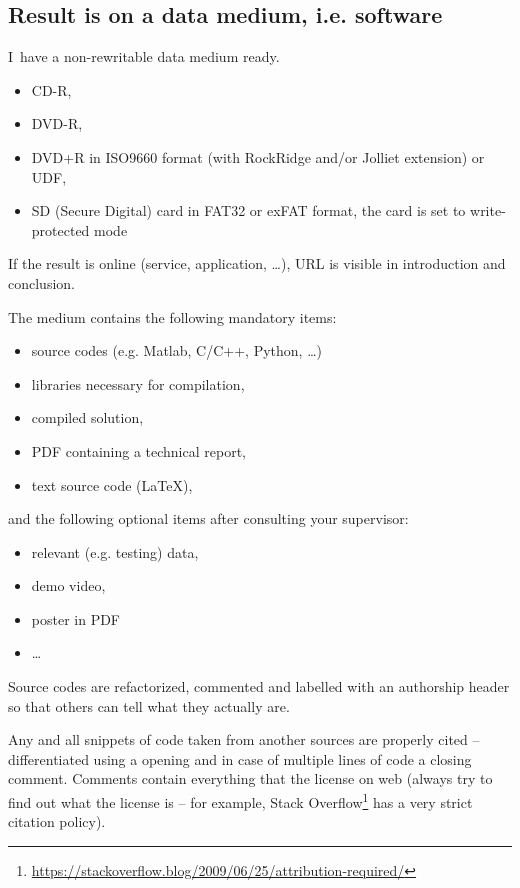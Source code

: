 \subsection*{Result is on a data medium, i.e. software}
\begin{checklist}
	\item I~have a non-rewritable data medium ready.
    \begin{itemize}
    	\item CD-R,
        \item DVD-R,
        \item DVD+R in ISO9660 format (with RockRidge and/or Jolliet extension) or UDF,
        \item SD (Secure Digital) card in FAT32 or exFAT format, the card is set to write-protected mode
    \end{itemize}
    \item If the result is online (service, application, …), URL is visible in introduction and conclusion.
    \item The medium contains the following mandatory items:
    \begin{itemize}
    	\item source codes (e.g. Matlab, C/C++, Python, \ldots)
        \item libraries necessary for compilation,
        \item compiled solution,
        \item PDF containing a technical report,
        \item text source code (\LaTeX{}),
    \end{itemize}
    and the following optional items after consulting your supervisor:
    \begin{itemize}
    	\item relevant (e.g. testing) data,
        \item demo video,
        \item poster in PDF
        \item \ldots
    \end{itemize}
    \item Source codes are refactorized, commented and labelled with an authorship header so that others can tell what they actually are.
    \item Any and all snippets of code taken from another sources are properly cited -- differentiated using a opening and in case of multiple lines of code a closing comment. Comments contain everything that the license on web (always try to find out what the license is -- for example, Stack Overflow\footnote{\url{https://stackoverflow.blog/2009/06/25/attribution-required/}} has a very strict citation policy).
\end{checklist}

